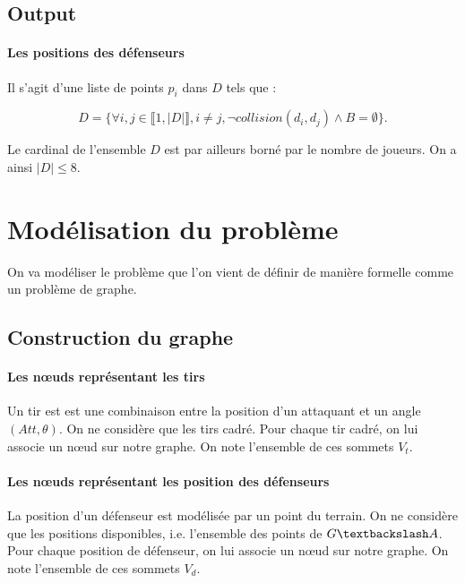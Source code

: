 \documentclass[12pt]{article}
\begin{document}
\subsection{Output}

\paragraph{Les positions des défenseurs} Il s'agit d'une liste de points $p_i$ dans $D$ tels que :

\begin{equation*}
D = \{ \forall i, j \in \llbracket 1, |D| \rrbracket, i \ne j, \neg collision(d_i, d_j) \wedge B = \emptyset \}.
\end{equation*}

Le cardinal de l'ensemble $D$ est par ailleurs borné par le nombre de joueurs. On a ainsi $|D| \leqslant 8$.



\section{Modélisation du problème}

On va modéliser le problème que l'on vient de définir de manière formelle comme un problème de graphe.

\subsection{Construction du graphe}

\paragraph{Les n\oe uds représentant les tirs}
Un tir est est une combinaison entre la position d'un attaquant et un angle $(Att, \theta)$. On ne considère que les tirs cadré. Pour chaque tir cadré, on lui associe un n\oe ud sur notre graphe. On note l'ensemble de ces sommets $V_t$.

\paragraph{Les n\oe uds représentant les position des défenseurs}
La position d'un défenseur est modélisée par un point du terrain. On ne considère que les positions disponibles, i.e. l'ensemble des points de $G\textbackslash A$. Pour chaque position de défenseur, on lui associe un n\oe ud sur notre graphe. On note l'ensemble de ces sommets $V_d$.
\end{document}
